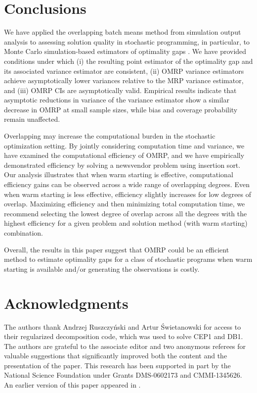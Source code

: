 \documentclass[12pt]{article}
\begin{document}
\section{Conclusions}
\label{sec:concl}

We have applied the overlapping batch means method from simulation output analysis \citep{Meketon1984,Song1992,Welch1987} to assessing solution quality in stochastic programming, in particular, to Monte Carlo simulation-based estimators of optimality gaps \citep{Mak1999}. 
We have provided conditions under which (i) the resulting point estimator of the optimality gap and its associated variance estimator are consistent, (ii) OMRP variance estimators achieve asymptotically lower variances relative to the MRP variance estimator, and (iii) OMRP CIs are asymptotically valid. 
Empirical results indicate that asymptotic reductions in variance of the variance estimator show a similar decrease in OMRP at small sample sizes, while bias and coverage probability remain unaffected. 

Overlapping may increase the computational burden in the stochastic optimization setting.
By jointly considering computation time and variance, we have examined the computational efficiency of OMRP, and we have empirically demonstrated  efficiency by solving a newsvendor problem using insertion sort.
Our analysis illustrates that when warm starting is effective, computational efficiency gains can be observed across a wide range of overlapping degrees.
Even when warm starting is less effective, efficiency slightly increases for low degrees of overlap. 
Maximizing efficiency and then minimizing total computation time, we recommend  selecting the lowest degree of overlap across all the degrees with the highest efficiency for a given problem and solution method (with warm starting) combination. 


Overall, the results in this paper suggest that OMRP could be an efficient method to estimate optimality gaps for a class of stochastic programs when warm starting is available and/or generating the observations is costly.
 

\section*{Acknowledgments}
The authors thank Andrzej Ruszczy{\'{n}}ski and Artur {\'{S}}wietanowski for
access to their regularized decomposition code, which was used to solve CEP1 and DB1. 
The authors are grateful to the associate editor and two anonymous referees for valuable suggestions that significantly improved both the content and the presentation of the paper. 
This research has been supported in part by the National Science Foundation under Grants DMS-0602173 and CMMI-1345626.
An earlier version of this paper appeared in \citep{love2011overlapping}.



\end{document}
